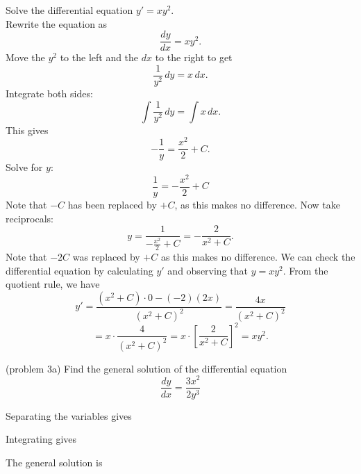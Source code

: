 \documentclass{ximera}
\begin{document}
\begin{example}[example 3]
Solve the differential equation $y' = xy^2$.\\
Rewrite the equation as 
\[
\frac{dy}{dx} = xy^2.
\]
Move the $y^2$ to the left and the $dx$ to the right to get
\[
\frac{1}{y^2} \, dy = x \,  dx.
\]
Integrate both sides:
\[
\int \frac{1}{y^2}\,  dy  = \int x \, dx.
\]
This gives
\[
-\frac{1}{y} = \frac{x^2}{2} + C.
\]
Solve for $y$:
\[
\frac{1}{y} = -\frac{x^2}{2} + C
\]
Note that $-C$ has been replaced by $+C$, as this makes no difference. Now take reciprocals:
\[
y = \frac{1}{-\frac{x^2}{2} + C} = - \frac{2}{x^2 + C}.
\]
Note that $-2C$ was replaced by $+C$ as this makes no difference.
We can check the differential equation by calculating $y'$ and observing that $y = xy^2$.
From the quotient rule, we have
\[
y' = \frac{(x^2 + C)\cdot 0 - (-2)(2x)}{(x^2 + C)^2} = \frac{4x}{(x^2 + C)^2} 
\]
\[
= x \cdot \frac{4}{(x^2 + C)^2} = x \cdot \left[\frac{2}{x^2 + C}\right]^2 = xy^2.
\]



\end{example}


\begin{problem}(problem 3a)
Find the general solution of the differential equation
\[
\frac{dy}{dx} = \frac{3x^2}{2y^3}
\]

Separating the variables gives

\begin{multipleChoice}
\end{multipleChoice}

Integrating gives

\begin{multipleChoice}
\end{multipleChoice}

The general solution is

\begin{multipleChoice}
\end{multipleChoice}

\end{problem}
\end{document}
